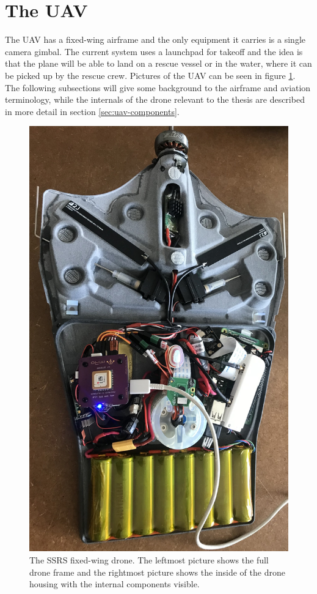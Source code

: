 \documentclass[nofilelist]{cslthse-msc}
\begin{document}
\section{The UAV}
\label{sec:fixed-wing-uav}
The UAV has a fixed-wing airframe and the only equipment it carries is a single camera gimbal. The current system uses a launchpad for takeoff and the idea is that the plane will be able to land on a rescue vessel or in the water, where it can be picked up by the rescue crew. Pictures of the UAV can be seen in figure \ref{fig:fv-drone-pics}. The following subsections will give some background to the airframe and aviation terminology, while the internals of the drone relevant to the thesis are described in more detail in section \ref{sec:uav-components}.

\begin{figure}[htp]
   \centering
   \includegraphics[width=.35\textwidth]{images/fv-1.jpg}
   \caption{The SSRS fixed-wing drone. The leftmost picture shows the full drone frame and the rightmost picture shows the inside of the drone housing with the internal components visible.}
   \label{fig:fv-drone-pics}
\end{figure}
\end{document}
